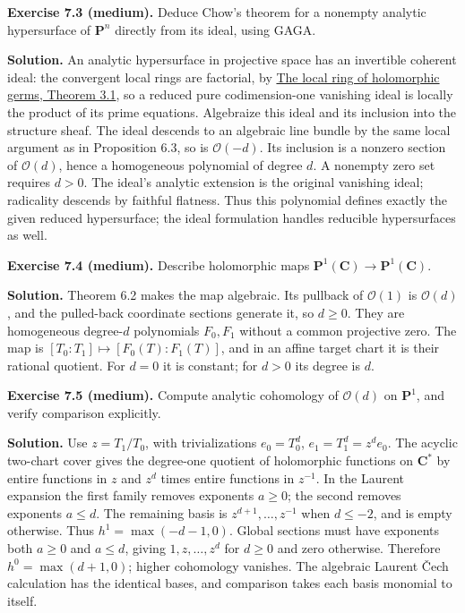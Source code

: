 \documentclass[11pt]{article}
\begin{document}
\textbf{Exercise 7.3 (medium).} Deduce Chow's theorem for a nonempty
analytic hypersurface of \(\mathbf P^n\) directly from its ideal, using
GAGA.

\textbf{Solution.} An analytic hypersurface in projective space has an
invertible coherent ideal: the convergent local rings are factorial, by
\href{../complex-analytic-spaces-and-coherent-sheaves/the-local-ring-of-holomorphic-germs.html\#3-unique-factorization}{The
local ring of holomorphic germs, Theorem 3.1}, so a reduced pure
codimension-one vanishing ideal is locally the product of its prime
equations. Algebraize this ideal and its inclusion into the structure
sheaf. The ideal descends to an algebraic line bundle by the same local
argument as in Proposition 6.3, so is \(\mathcal O(-d)\). Its inclusion
is a nonzero section of \(\mathcal O(d)\), hence a homogeneous
polynomial of degree \(d\). A nonempty zero set requires \(d>0\). The
ideal's analytic extension is the original vanishing ideal; radicality
descends by faithful flatness. Thus this polynomial defines exactly the
given reduced hypersurface; the ideal formulation handles reducible
hypersurfaces as well.

\textbf{Exercise 7.4 (medium).} Describe holomorphic maps
\(\mathbf P^1(\mathbf C)\to\mathbf P^1(\mathbf C)\).

\textbf{Solution.} Theorem 6.2 makes the map algebraic. Its pullback of
\(\mathcal O(1)\) is \(\mathcal O(d)\), and the pulled-back coordinate
sections generate it, so \(d\geq0\). They are homogeneous degree-\(d\)
polynomials \(F_0,F_1\) without a common projective zero. The map is
\([T_0:T_1]\mapsto[F_0(T):F_1(T)]\), and in an affine target chart it is
their rational quotient. For \(d=0\) it is constant; for \(d>0\) its
degree is \(d\).

\textbf{Exercise 7.5 (medium).} Compute analytic cohomology of
\(\mathcal O(d)\) on \(\mathbf P^1\), and verify comparison explicitly.

\textbf{Solution.} Use \(z=T_1/T_0\), with trivializations
\(e_0=T_0^d\), \(e_1=T_1^d=z^de_0\). The acyclic two-chart cover gives
the degree-one quotient of holomorphic functions on \(\mathbf C^*\) by
entire functions in \(z\) and \(z^d\) times entire functions in
\(z^{-1}\). In the Laurent expansion the first family removes exponents
\(a\geq0\); the second removes exponents \(a\leq d\). The remaining
basis is \(z^{d+1},\ldots,z^{-1}\) when \(d\leq-2\), and is empty
otherwise. Thus \(h^1=\max(-d-1,0)\). Global sections must have
exponents both \(a\geq0\) and \(a\leq d\), giving \(1,z,\ldots,z^d\) for
\(d\geq0\) and zero otherwise. Therefore \(h^0=\max(d+1,0)\); higher
cohomology vanishes. The algebraic Laurent Čech calculation has the
identical bases, and comparison takes each basis monomial to itself.
\end{document}
